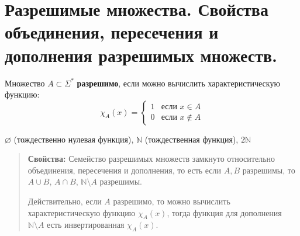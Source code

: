 \section{Разрешимые множества. Свойства объединения, пересечения и дополнения разрешимых множеств.}
\begin{definition}
	Множество $A \subset \Sigma^*$ \textbf{разрешимо}, если можно вычислить характеристическую функцию:
	\begin{equation*}
		\chi_{A}(x) = 
		\begin{cases}
			1 &\text{если $x \in A$}\\
			0 &\text{если $x \notin A$}
		\end{cases}
	\end{equation*}
\end{definition}
\begin{example}
	$\varnothing$ (тождественно нулевая функция), $\mathbb{N}$ (тождественная функция), $2\mathbb{N}$
\end{example}


\begin{quote} {\textbf{Свойства: }}
	Семейство разрешимых множеств замкнуто относительно объединения, пересечения и дополнения, то есть если $A, B$
	разрешимы, то $A \cup B$, $A \cap B$, $\mathbb{N} \setminus A$ разрешимы.
	\par Действительно, если $A$ разрешимо, то можно вычислить характеристическую функцию $\chi_{A}(x)$, тогда
	функция для дополнения $\mathbb{N} \setminus A$ есть инвертированная $\chi_{A}(x)$.
\end{quote}
